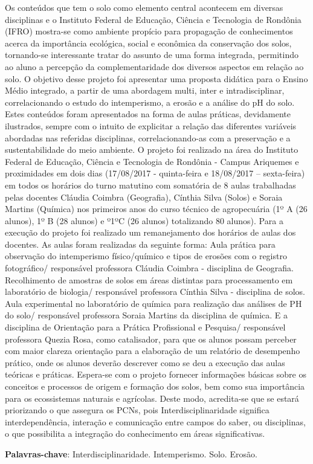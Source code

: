 \documentclass[article,12pt,onesidea,4paper,english,brazil]{abntex2}
\begin{document}
	\noindent Os conteúdos que tem o solo como elemento central acontecem em
	diversas disciplinas e o Instituto Federal de Educação, Ciência e Tecnologia de
	Rondônia (IFRO) mostra-se como ambiente propício para
	propagação de conhecimentos acerca da importância ecológica, social e econômica
	da conservação dos solos, tornando-se interessante tratar do assunto de uma forma
	integrada, permitindo ao aluno a percepção da complementaridade dos diversos
	aspectos em relação ao solo. O objetivo desse projeto foi apresentar uma proposta
	didática para o Ensino Médio integrado, a partir de uma abordagem multi, inter e
	intradisciplinar, correlacionando o estudo do intemperismo, a erosão e a análise do
	pH do solo. Estes conteúdos foram apresentados na forma de aulas práticas,
	devidamente ilustrados, sempre com o intuito de explicitar a relação das diferentes
	variáveis abordadas nas referidas disciplinas, correlacionando-as com a preservação
	e a sustentabilidade do meio ambiente. O projeto foi realizado na área do Instituto
	Federal de Educação, Ciência e Tecnologia de Rondônia - Campus Ariquemes e
	proximidades em dois dias (17/08/2017 - quinta-feira e 18/08/2017 – sexta-feira) em
	todos os horários do turno matutino com somatória de 8 aulas trabalhadas pelas
	docentes Cláudia Coimbra (Geografia), Cínthia Silva (Solos) e Soraia Martins
	(Química) nos primeiros anos do curso técnico de agropecuária (1º A (26 alunos), 1º
	B (28 alunos) e º1ºC (26 alunos) totalizando 80 alunos). Para a execução do projeto
	foi realizado um remanejamento dos horários de aulas dos docentes. As aulas foram
	realizadas da seguinte forma: Aula prática para observação do intemperismo
	físico/químico e tipos de erosões com o registro fotográfico/ responsável professora
	Cláudia Coimbra - disciplina de Geografia. Recolhimento de amostras de solos em
	áreas distintas para processamento em laboratório de biologia/ responsável
	professora Cínthia Silva - disciplina de solos. Aula experimental no laboratório de
	química para realização das análises de PH do solo/ responsável professora Soraia
	Martins da disciplina de química. E a disciplina de Orientação para a Prática
	Profissional e Pesquisa/ responsável professora Quezia Rosa, como catalisador,
	para que os alunos possam perceber com maior clareza orientação para a
	elaboração de um relatório de desempenho prático, onde os alunos deverão
	descrever como se deu a execução das aulas teóricas e práticas. Espera-se com o
	projeto fornecer informações básicas sobre os conceitos e processos de origem e
	formação dos solos, bem como sua importância para os ecossistemas naturais e
	agrícolas. Deste modo, acredita-se que se estará priorizando o que assegura os
	PCNs, pois Interdisciplinaridade significa interdependência, interação e comunicação
	entre campos do saber, ou disciplinas, o que possibilita a integração do
	conhecimento em áreas significativas.
	
	\vspace{\onelineskip}
	
	\noindent
	\textbf{Palavras-chave}: Interdisciplinaridade. Intemperismo. Solo. Erosão.
	
\end{document}
